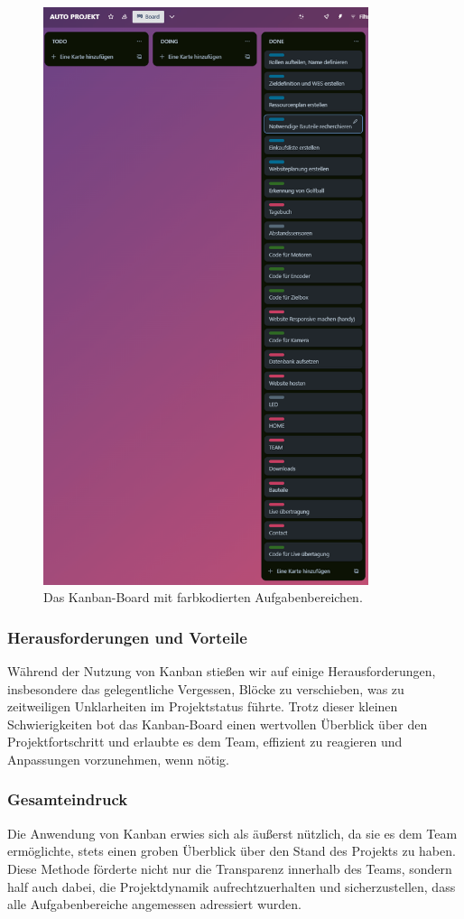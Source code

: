\begin{figure}[H]
\centering
\includegraphics[width=0.85\textwidth]{Resources/kanban_board.png}
\caption{Das Kanban-Board mit farbkodierten Aufgabenbereichen.}
\end{figure}

\subsubsection{Herausforderungen und Vorteile}
Während der Nutzung von Kanban stießen wir auf einige Herausforderungen, insbesondere das gelegentliche Vergessen, Blöcke zu verschieben, was zu zeitweiligen Unklarheiten im Projektstatus führte. Trotz dieser kleinen Schwierigkeiten bot das Kanban-Board einen wertvollen Überblick über den Projektfortschritt und erlaubte es dem Team, effizient zu reagieren und Anpassungen vorzunehmen, wenn nötig.

\subsubsection{Gesamteindruck}
Die Anwendung von Kanban erwies sich als äußerst nützlich, da sie es dem Team ermöglichte, stets einen groben Überblick über den Stand des Projekts zu haben. Diese Methode förderte nicht nur die Transparenz innerhalb des Teams, sondern half auch dabei, die Projektdynamik aufrechtzuerhalten und sicherzustellen, dass alle Aufgabenbereiche angemessen adressiert wurden.
